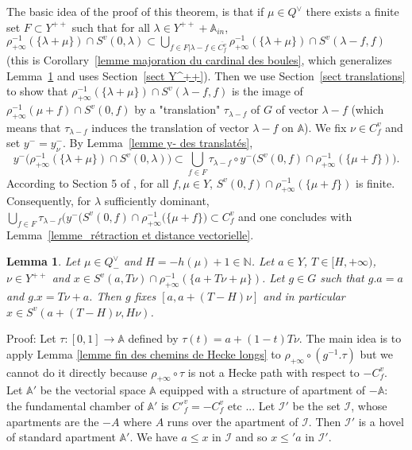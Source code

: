 \documentclass[12pt]{article}
\theoremstyle{plain}
\newtheorem{lemme}[thm]{Lemma}
\theoremstyle{definition}
\newcommand{\A}{\mathbb{A}}
\newcommand{\N}{\mathbb{N}}
\newcommand{\I}{\mathcal{I}}
\begin{document}
The basic idea of the proof of this theorem, is that if $\mu\in Q^\vee$ there exists a finite set $F\subset Y^{++}$ such that for all $\lambda\in Y^{++}+\A_{in}$, $\rho_{+\infty}^{-1}(\{\lambda+\mu\})\cap S^v(0,\lambda) \subset \bigcup_{f\in F|\lambda-f\in\overline{C^v_f}} \rho_{+\infty}^{-1}(\{\lambda+\mu\})\cap S^v(\lambda-f,f)$ (this is Corollary~\ref{lemme majoration du cardinal des boules}, which generalizes Lemma~\ref{lemme distance finie à l'appartement} and uses Section~\ref{sect Y^++}). Then we use Section~\ref{sect translations} to show  that $\rho_{+\infty}^{-1}(\{\lambda+\mu\})\cap S^v(\lambda-f,f)$ is the image of $\rho_{+\infty}^{-1}(\mu+f)\cap S^v(0,f)$ by a "translation" $\tau_{\lambda-f}$ of $G$ of vector $\lambda-f$ (which means that $\tau_{\lambda-f}$ induces the translation of vector $\lambda-f$ on $\mathbb{A}$). We fix $\nu\in C_f^v$ and set $y^-=y_\nu^-$. By Lemma~\ref{lemme y- des translatés},  \[y^-\big(\rho_{+\infty}^{-1}(\{\lambda+\mu\})\cap S^v(0,\lambda)\big)\subset\bigcup_{f\in F}\tau_{\lambda-f}\circ y^-\big(S^v(0,f)\cap \rho_{+\infty}^{-1}(\{\mu +f\})\big).\] According to Section 5 of \cite{gaussent2014spherical}, for all $f, \mu \in Y$, $S^v(0,f)\cap \rho_{+\infty}^{-1}(\{\mu +f\})$ is finite. Consequently, for $\lambda$ sufficiently dominant, $\bigcup_{f\in F}\tau_{\lambda-f}\big(y^-(S^v(0,f)\cap \rho_{+\infty}^{-1}(\{\mu +f\}\big)\subset C^v_f$  and one concludes with Lemma~\ref{lemme_rétraction et distance vectorielle}. 
 



\begin{lemme}\label{lemme distance finie à l'appartement}
Let $\mu\in Q^\vee_-$ and $H=-h(\mu)+1\in \N$. Let $a\in Y$, $T\in [H,+\infty)$, $\nu\in Y^{++}$ and $x\in S^v(a,T\nu)\cap\rho_{+\infty}^{-1}(\{a+T\nu+\mu\})$. Let $g\in G$ such that $g.a=a$ and $g.x=T\nu+a$. Then $g$ fixes $[a,a+(T-H)\nu]$ and in particular $x\in S^v(a+(T-H)\nu,H\nu)$.
\end{lemme}

Proof: Let $\tau:[0,1]\rightarrow \mathbb{A}$ defined by $\tau(t)=a+(1-t)T\nu$. The main idea is to apply Lemma \ref{lemme fin des chemins de Hecke longs} to $\rho_{+\infty}\circ (g^{-1}.\tau)$ but we cannot do it directly because $\rho_{+\infty}\circ\tau$ is not a Hecke path with respect to $-C^v_f$. Let $\mathbb{A}'$ be the vectorial space $\mathbb{A}$ equipped with a structure of apartment of $-\mathbb{A}$: the fundamental chamber of $\mathbb{A}'$ is $C'^v_f=-C^v_f$ etc ... Let $\mathcal{I}'$ be the set $\mathcal{I}$, whose apartments are the $-A$ where $A$ runs over the apartment of $\I$. Then $\mathcal{I}'$ is a hovel of standard apartment $\mathbb{A}'$. We have $a\leq x$ in $\mathcal{I}$ and so $x\leq'a$ in $\mathcal{I}'$. 
 
\end{document}
